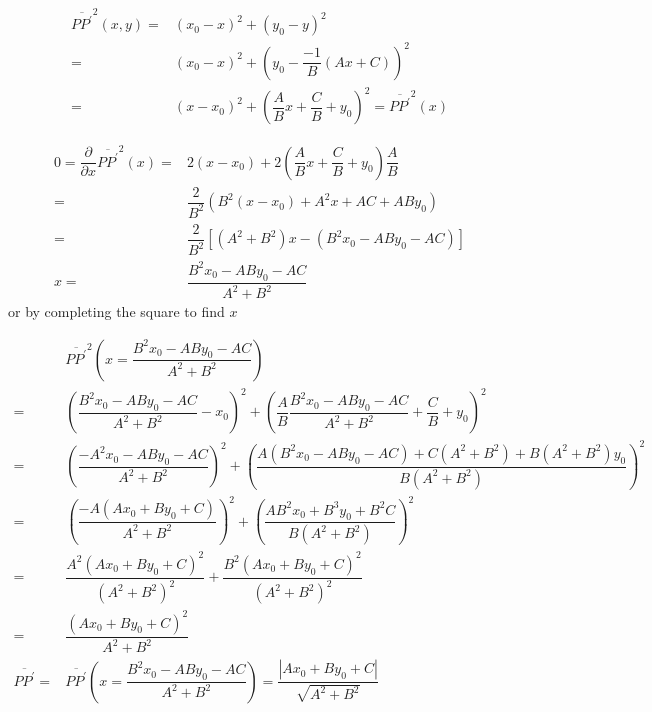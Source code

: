 \documentclass[
]{book}
\theoremstyle{definition}
\theoremstyle{definition}
\theoremstyle{definition}
\theoremstyle{definition}
\theoremstyle{remark}
\begin{document}
\[
\begin{aligned}
\overline{PP^{\prime}}^{2}\left(x,y\right)= & \left(x_{0}-x\right)^{2}+\left(y_{0}-y\right)^{2}\\
= & \left(x_{0}-x\right)^{2}+\left(y_{0}-\dfrac{-1}{B}\left(Ax+C\right)\right)^{2}\\
= & \left(x-x_{0}\right)^{2}+\left(\dfrac{A}{B}x+\dfrac{C}{B}+y_{0}\right)^{2}=\overline{PP^{\prime}}^{2}\left(x\right)
\end{aligned}
\]

\[
\begin{aligned}
0=\dfrac{\partial}{\partial x}\overline{PP^{\prime}}^{2}\left(x\right)= & 2\left(x-x_{0}\right)+2\left(\dfrac{A}{B}x+\dfrac{C}{B}+y_{0}\right)\dfrac{A}{B}\\
= & \dfrac{2}{B^{2}}\left(B^{2}\left(x-x_{0}\right)+A^{2}x+AC+ABy_{0}\right)\\
= & \dfrac{2}{B^{2}}\left[\left(A^{2}+B^{2}\right)x-\left(B^{2}x_{0}-ABy_{0}-AC\right)\right]\\
x= & \dfrac{B^{2}x_{0}-ABy_{0}-AC}{A^{2}+B^{2}}
\end{aligned}
\]
or by completing the square to find \(x\)

\[
\begin{aligned}
 & \overline{PP^{\prime}}^{2}\left(x=\dfrac{B^{2}x_{0}-ABy_{0}-AC}{A^{2}+B^{2}}\right)\\
= & \left(\dfrac{B^{2}x_{0}-ABy_{0}-AC}{A^{2}+B^{2}}-x_{0}\right)^{2}+\left(\dfrac{A}{B}\dfrac{B^{2}x_{0}-ABy_{0}-AC}{A^{2}+B^{2}}+\dfrac{C}{B}+y_{0}\right)^{2}\\
= & \left(\dfrac{-A^{2}x_{0}-ABy_{0}-AC}{A^{2}+B^{2}}\right)^{2}+\left(\dfrac{A\left(B^{2}x_{0}-ABy_{0}-AC\right)+C\left(A^{2}+B^{2}\right)+B\left(A^{2}+B^{2}\right)y_{0}}{B\left(A^{2}+B^{2}\right)}\right)^{2}\\
= & \left(\dfrac{-A\left(Ax_{0}+By_{0}+C\right)}{A^{2}+B^{2}}\right)^{2}+\left(\dfrac{AB^{2}x_{0}+B^{3}y_{0}+B^{2}C}{B\left(A^{2}+B^{2}\right)}\right)^{2}\\
= & \dfrac{A^{2}\left(Ax_{0}+By_{0}+C\right)^{2}}{\left(A^{2}+B^{2}\right)^{2}}+\dfrac{B^{2}\left(Ax_{0}+By_{0}+C\right)^{2}}{\left(A^{2}+B^{2}\right)^{2}}\\
= & \dfrac{\left(Ax_{0}+By_{0}+C\right)^{2}}{A^{2}+B^{2}}\\
\overline{PP^{\prime}}= & \overline{PP^{\prime}}\left(x=\dfrac{B^{2}x_{0}-ABy_{0}-AC}{A^{2}+B^{2}}\right)=\dfrac{\left|Ax_{0}+By_{0}+C\right|}{\sqrt{A^{2}+B^{2}}}
\end{aligned}
\]
\end{document}
